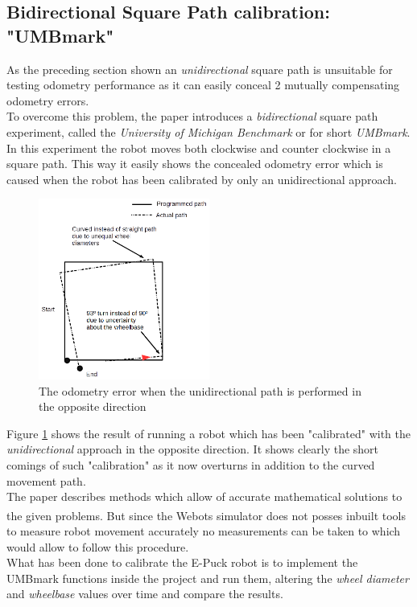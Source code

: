 \subsection{Bidirectional Square Path calibration: "UMBmark"}
As the preceding section shown an \textit{unidirectional} square path is unsuitable for testing odometry performance as it can easily conceal 2 mutually compensating odometry errors.\\
To overcome this problem, the paper introduces a \textit{bidirectional} square path experiment, called the \textit{University of Michigan Benchmark} or for short \textit{UMBmark}. 
In this experiment the robot moves both clockwise and counter clockwise in a square path. This way it easily shows the concealed odometry error which is caused when the robot has been calibrated by only an unidirectional approach.\\

\begin{figure}[h]
\centering
\includegraphics[width = 0.5\textwidth]{../../figures/unidirectional_error} 
\caption{The odometry error when the unidirectional path is performed in the opposite direction}
\label{unidirectional_error}
\end{figure}

Figure \ref{unidirectional_error} shows the result of running a robot which has been "calibrated" with the \textit{unidirectional} approach in the opposite direction. It shows clearly the short comings of such "calibration" as it now overturns in addition to the curved movement path.\\[3ex]

The paper describes methods which allow of accurate mathematical solutions to the given problems. But since the  Webots\textsuperscript{\texttrademark} simulator does not posses inbuilt tools to measure robot movement accurately no measurements can be taken to which would allow to follow this procedure.\\
What has been done to calibrate the E-Puck robot is to implement the UMBmark functions inside the project and run them, altering the \textit{wheel diameter} and \textit{wheelbase} values over time and compare the results.\\


